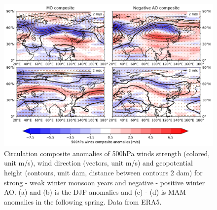 \begin{figure}[htbp]
    \centering
    \includegraphics[width=\textwidth]{texfiles/figs/winter_MO_AO_composite_500h.pdf}
    \caption{Circulation composite anomalies of 500hPa winds strength (colored, unit m/s), wind direction (vectors, unit m/s) and geopotential height (contours, unit dam, distance between contours 2 dam) for strong - weak winter monsoon years and negative - positive winter AO. (a) and (b) is the DJF anomalies and (c) - (d) is MAM anomalies in the following spring. Data from ERA5.}
    \label{fig:mo_ao_composite_500hPa}
\end{figure}







